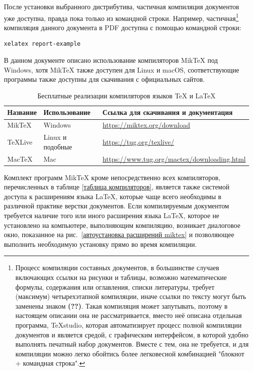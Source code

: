 \documentclass[workbook, draught]{fefudoc}
\begin{document}
После установки выбранного дистрибутива, частичная компиляция документов уже доступна, правда пока только из командной строки.
Например,
частичная\footnote{Процесс компиляции составных документов, в большинстве случаев включающих ссылки на рисунки и таблицы, возможно математические формулы, содержания или оглавления, списки литературы, требует (максимум) четырехэтапной компиляции, иначе ссылки по тексту могут быть заменены знаком \textbf{(??)}. Такая компиляция может запутывать, поэтому в настоящем описании она не рассматривается, вместо неё описана отдельная программа, TeXstudio, которая автоматизирует процесс полной компиляции документов и является средой, с графическим интерфейсом, в которой удобно выполнять печатный набор документов. Вместе с тем, она не требуется, и для компиляции можно легко обойтись более легковесной комбинацией "блокнот + командная строка".}
компиляция данного документа в PDF доступна с помощью командной строки:
\begin{lstlisting}
xelatex report-example
\end{lstlisting}

В данном документе описано использование компиляторов MikTeX под Windows, хотя MikTeX также доступен для Linux и macOS, соответствующие программы также доступны для скачивания с официальных сайтов.

\begin{table}[ht]\small
\centering
\caption{Бесплатные реализации компиляторов языков \TeX{} и \LaTeX{}}
\label{таблица дистрибутивов}
\begin{tabularx}{\textwidth}{|l|l|X|}
\hline
\textbf{Название} & \textbf{Использование} & \textbf{Ссылка для скачивания и документация}     \\ \hline
MikTeX            & Windows                & \url{https://miktex.org/download}                 \\ \hline
TeXLive           & Linux и подобные       & \url{https://tug.org/texlive/}                    \\ \hline
MacTeX            & Mac                    & \url{https://www.tug.org/mactex/downloading.html} \\ \hline
\end{tabularx}
\end{table}

Комплект программ MikTeX кроме непосредственно всех компиляторов, перечисленных в таблице \ref{таблица компиляторов}, является также системой доступа к расширениям языка \LaTeX{}, которые чаще всего необходимы в различной практике верстки документов.
Если компилируемым документом требуется наличие того или иного расширения языка \LaTeX, которое не установлено на компьютере, выполняющим компиляцию, возникает диалоговое окно, показанное на рис.~\ref{автоустановка расширений miktex} и позволяющее выполнить необходимую установку прямо во время компиляции.
\end{document}

